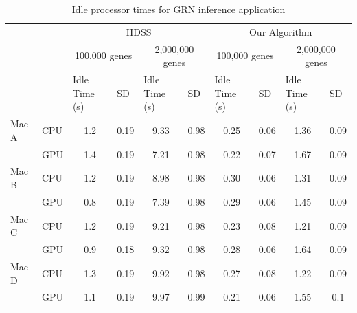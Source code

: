 \documentclass[journal]{IEEEtran}
\begin{document}
\begin{table}[htb]
\centering
\caption{Idle processor times for GRN inference application}
\begin{scriptsize}
\begin{tabular}{|l|l|l|l|l|l|l|l|l|l|}
\cline{3-10}
\multicolumn{1}{l}{} &  & \multicolumn{4}{c|}{HDSS} & \multicolumn{4}{c|}{Our Algorithm} \\ 
\cline{3-10}
\multicolumn{1}{l}{} &  & \multicolumn{2}{c|}{100,000 genes} & \multicolumn{2}{c|}{2,000,000 genes} & \multicolumn{2}{c|}{100,000 genes} & \multicolumn{2}{c|}{2,000,000 genes} \\ 
\cline{3-10}
\multicolumn{1}{l}{} &  & Idle Time (s) & SD & Idle Time (s) & SD & Idle Time (s) & SD & Idle Time (s) & SD \\ 
\hline
Mac A & CPU & \multicolumn{1}{c|}{1.2} & \multicolumn{1}{c|}{0.19} & \multicolumn{1}{c|}{9.33} & \multicolumn{1}{c|}{0.98} & \multicolumn{1}{c|}{0.25} & \multicolumn{1}{c|}{0.06} & \multicolumn{1}{c|}{1.36} & \multicolumn{1}{c|}{0.09} \\ 
\cline{2-10}
 & GPU & \multicolumn{1}{c|}{1.4} & \multicolumn{1}{c|}{0.19} & \multicolumn{1}{c|}{7.21} & \multicolumn{1}{c|}{0.98} & \multicolumn{1}{c|}{0.22} & \multicolumn{1}{c|}{0.07} & \multicolumn{1}{c|}{1.67} & \multicolumn{1}{c|}{0.09} \\ 
\hline
Mac B & CPU & \multicolumn{1}{c|}{1.2} & \multicolumn{1}{c|}{0.19} & \multicolumn{1}{c|}{8.98} & \multicolumn{1}{c|}{0.98} & \multicolumn{1}{c|}{0.30} & \multicolumn{1}{c|}{0.06} & \multicolumn{1}{c|}{1.31} & \multicolumn{1}{c|}{0.09} \\ 
\cline{2-10}
 & GPU & \multicolumn{1}{c|}{0.8} & \multicolumn{1}{c|}{0.19} & \multicolumn{1}{c|}{7.39} & \multicolumn{1}{c|}{0.98} & \multicolumn{1}{c|}{0.29} & \multicolumn{1}{c|}{0.06} & \multicolumn{1}{c|}{1.45} & \multicolumn{1}{c|}{0.09} \\ 
\hline
Mac C & CPU & \multicolumn{1}{c|}{1.2} & \multicolumn{1}{c|}{0.19} & \multicolumn{1}{c|}{9.21} & \multicolumn{1}{c|}{0.98} & \multicolumn{1}{c|}{0.23} & \multicolumn{1}{c|}{0.08} & \multicolumn{1}{c|}{1.21} & \multicolumn{1}{c|}{0.09} \\ 
\cline{2-10}
 & GPU & \multicolumn{1}{c|}{0.9} & \multicolumn{1}{c|}{0.18} & \multicolumn{1}{c|}{9.32} & \multicolumn{1}{c|}{0.98} & \multicolumn{1}{c|}{0.28} & \multicolumn{1}{c|}{0.06} & \multicolumn{1}{c|}{1.64} & \multicolumn{1}{c|}{0.09} \\ 
\hline
Mac D & CPU & \multicolumn{1}{c|}{1.3} & \multicolumn{1}{c|}{0.19} & \multicolumn{1}{c|}{9.92} & \multicolumn{1}{c|}{0.98} & \multicolumn{1}{c|}{0.27} & \multicolumn{1}{c|}{0.08} & \multicolumn{1}{c|}{1.22} & \multicolumn{1}{c|}{0.09} \\ 
\cline{2-10}
 & GPU & \multicolumn{1}{c|}{1.1} & \multicolumn{1}{c|}{0.19} & \multicolumn{1}{c|}{9.97} & \multicolumn{1}{c|}{0.99} & \multicolumn{1}{c|}{0.21} & \multicolumn{1}{c|}{0.06} & \multicolumn{1}{c|}{1.55} & \multicolumn{1}{c|}{0.1} \\ 
\hline
\end{tabular}
\end{scriptsize}
\label{table: ociosidadeGene}
\end{table}
\end{document}
